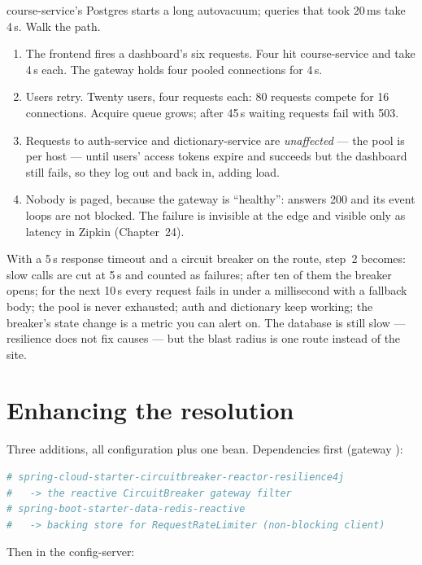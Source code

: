 course-service's Postgres starts a long autovacuum; queries that took
20\,ms take 4\,s. Walk the path.

\begin{enumerate}
  \item The frontend fires a dashboard's six requests. Four hit
  course-service and take 4\,s each. The gateway holds four pooled
  connections for 4\,s.
  \item Users retry. Twenty users, four requests each: 80 requests
  compete for 16 connections. Acquire queue grows; after 45\,s waiting
  requests fail with 503.
  \item Requests to auth-service and dictionary-service are
  \emph{unaffected} --- the pool is per host --- until users' access
  tokens expire and  succeeds but the dashboard still
  fails, so they log out and back in, adding load.
  \item Nobody is paged, because the gateway is ``healthy'':
   answers 200 and its event loops are not
  blocked. The failure is invisible at the edge and visible only as
  latency in Zipkin (Chapter~24).
\end{enumerate}

With a 5\,s response timeout and a circuit breaker on the route, step~2
becomes: slow calls are cut at 5\,s and counted as failures; after ten
of them the breaker opens; for the next 10\,s every 
request fails in under a millisecond with a fallback body; the pool is
never exhausted; auth and dictionary keep working; the breaker's state
change is a metric you can alert on. The database is still slow ---
resilience does not fix causes --- but the blast radius is one route
instead of the site.

\section{Enhancing the resolution}
\label{sec:gw-enhance}

Three additions, all configuration plus one bean. Dependencies first
(gateway ):

\begin{lstlisting}[language=yaml]
# spring-cloud-starter-circuitbreaker-reactor-resilience4j
#   -> the reactive CircuitBreaker gateway filter
# spring-boot-starter-data-redis-reactive
#   -> backing store for RequestRateLimiter (non-blocking client)
\end{lstlisting}

Then  in the config-server:

